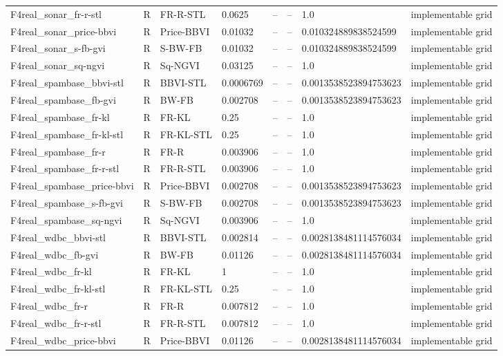 \begin{tabular}{llllllll}
F4real\_sonar\_fr-r-stl & R & FR-R-STL & 0.0625 & -- & -- & 1.0 & implementable grid \\
F4real\_sonar\_price-bbvi & R & Price-BBVI & 0.01032 & -- & -- & 0.010324889838524599 & implementable grid \\
F4real\_sonar\_s-fb-gvi & R & S-BW-FB & 0.01032 & -- & -- & 0.010324889838524599 & implementable grid \\
F4real\_sonar\_sq-ngvi & R & Sq-NGVI & 0.03125 & -- & -- & 1.0 & implementable grid \\
F4real\_spambase\_bbvi-stl & R & BBVI-STL & 0.0006769 & -- & -- & 0.0013538523894753623 & implementable grid \\
F4real\_spambase\_fb-gvi & R & BW-FB & 0.002708 & -- & -- & 0.0013538523894753623 & implementable grid \\
F4real\_spambase\_fr-kl & R & FR-KL & 0.25 & -- & -- & 1.0 & implementable grid \\
F4real\_spambase\_fr-kl-stl & R & FR-KL-STL & 0.25 & -- & -- & 1.0 & implementable grid \\
F4real\_spambase\_fr-r & R & FR-R & 0.003906 & -- & -- & 1.0 & implementable grid \\
F4real\_spambase\_fr-r-stl & R & FR-R-STL & 0.003906 & -- & -- & 1.0 & implementable grid \\
F4real\_spambase\_price-bbvi & R & Price-BBVI & 0.002708 & -- & -- & 0.0013538523894753623 & implementable grid \\
F4real\_spambase\_s-fb-gvi & R & S-BW-FB & 0.002708 & -- & -- & 0.0013538523894753623 & implementable grid \\
F4real\_spambase\_sq-ngvi & R & Sq-NGVI & 0.003906 & -- & -- & 1.0 & implementable grid \\
F4real\_wdbc\_bbvi-stl & R & BBVI-STL & 0.002814 & -- & -- & 0.0028138481114576034 & implementable grid \\
F4real\_wdbc\_fb-gvi & R & BW-FB & 0.01126 & -- & -- & 0.0028138481114576034 & implementable grid \\
F4real\_wdbc\_fr-kl & R & FR-KL & 1 & -- & -- & 1.0 & implementable grid \\
F4real\_wdbc\_fr-kl-stl & R & FR-KL-STL & 0.25 & -- & -- & 1.0 & implementable grid \\
F4real\_wdbc\_fr-r & R & FR-R & 0.007812 & -- & -- & 1.0 & implementable grid \\
F4real\_wdbc\_fr-r-stl & R & FR-R-STL & 0.007812 & -- & -- & 1.0 & implementable grid \\
F4real\_wdbc\_price-bbvi & R & Price-BBVI & 0.01126 & -- & -- & 0.0028138481114576034 & implementable grid \\

\end{tabular}

